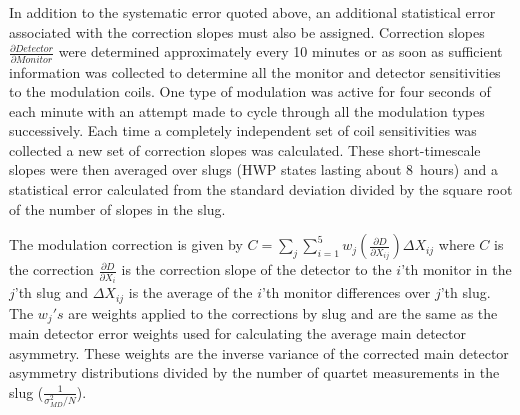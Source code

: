 In addition to the systematic error quoted above, an additional statistical error associated with the correction slopes must also be assigned. Correction slopes $\frac{\partial Detector}{\partial Monitor}$ were determined approximately every 10 minutes or as soon as sufficient information was collected to determine all the monitor and detector sensitivities to the modulation coils. One type of modulation was active for four seconds of each minute with an attempt made to cycle through all the modulation types successively. Each time a completely independent set of coil sensitivities was collected a new set of correction slopes was calculated. These short-timescale slopes were then averaged over slugs (HWP states lasting about 8~hours) and a statistical error calculated from the standard deviation divided by the square root of the number of slopes in the slug. 

The modulation correction is given by $C=\sum_j\sum_{i=1}^5w_j\left(\frac{\partial D}{\partial X_{ij}}\right)\Delta X_{ij}$ where $C$ is the correction $\frac{\partial D}{\partial X_i}$ is the correction slope of the detector to the $i$'th monitor in the $j$'th slug and $\Delta X_{ij}$ is the average of the $i$'th monitor differences over $j$'th slug. The $w_j's$ are weights applied to the corrections by slug and are the same as the main detector error weights used for calculating the average main detector asymmetry. These weights are the inverse variance of the corrected main detector asymmetry distributions divided by the number of quartet measurements in the slug ($\frac{1}{\sigma_{MD}^2/N}$). 

